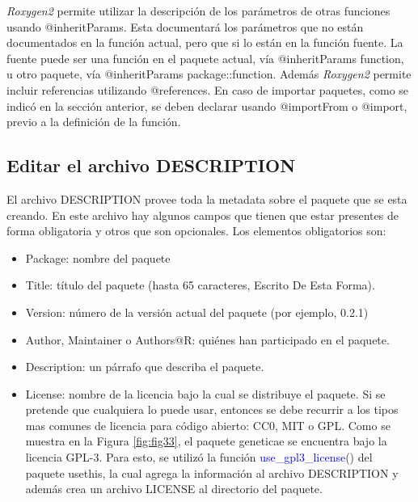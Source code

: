 \emph{Roxygen2} permite utilizar la descripción de los parámetros de otras funciones usando @inheritParams. Esta documentará los parámetros que no están documentados en la función actual, pero que si lo están en la función fuente. La fuente puede ser una función en el paquete actual, vía @inheritParams function, u otro paquete, vía @inheritParams package::function. Además \emph{Roxygen2} permite incluir referencias utilizando @references. En caso de importar paquetes, como se indicó en la sección anterior, se deben declarar usando @importFrom o @import, previo a la definición de la función.


\subsection{Editar el archivo DESCRIPTION}

El archivo DESCRIPTION provee toda la metadata sobre el paquete que se esta creando. En este archivo hay algunos campos que tienen que estar presentes de forma obligatoria y otros que son opcionales. Los elementos obligatorios son:

\begin{itemize}
\item Package: nombre del paquete
\item Title: título del paquete (hasta 65 caracteres, Escrito De Esta Forma).
\item Version: número de la versión actual del paquete (por ejemplo, 0.2.1)
\item Author, Maintainer o Authors@R: quiénes han participado en el paquete.
\item Description: un párrafo que describa el paquete.
\item License: nombre de la licencia bajo la cual se distribuye el paquete. Si se pretende que cualquiera lo puede usar, entonces se debe recurrir a los tipos mas comunes de licencia para código abierto: CC0, MIT o GPL. Como se muestra en la Figura \ref{fig:fig33}, el paquete geneticae se encuentra bajo la licencia GPL-3. Para esto, se utilizó la función \textcolor{blue}{use\_gpl3\_license}() del paquete usethis, la cual agrega la información al archivo DESCRIPTION y además crea un archivo LICENSE al directorio del paquete.
\end{itemize}




